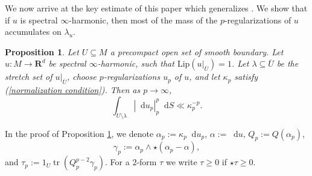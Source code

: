 \documentclass[reqno,11pt]{amsart}
\newcommand{\RR}{\mathbf{R}}
\newcommand*\dif{\mathop{}\!\mathrm{d}}
\DeclareMathOperator{\tr}{tr}
\newcommand{\Lip}{\mathrm{Lip}}
\newtheorem{proposition}[theorem]{Proposition}
\theoremstyle{definition}
\numberwithin{equation}{section}
\begin{document}
We now arrive at the key estimate of this paper which generalizes \cite[Proposition 6.5]{daskalopoulos2022transverse}.
We show that if $u$ is spectral $\infty$-harmonic, then most of the mass of the $p$-regularizations of $u$ accumulates on $\lambda_u$.

\begin{proposition}\label{main estimate}
Let $U \subseteq M$ a precompact open set of smooth boundary.
Let $u: M \to \RR^d$ be spectral $\infty$-harmonic, such that $\Lip(u|_{\overline U}) = 1$.
Let $\lambda \subseteq \overline U$ be the stretch set of $u|_{\overline U}$, choose $p$-regularizations $u_p$ of $u$, and let $\kappa_p$ satisfy (\ref{normalization condition}).
Then as $p \to \infty$,
\begin{equation}\label{decay}
\int_{U \setminus \lambda} |\dif u_p|_{p}^p \dif S \ll \kappa_p^{-p}.
\end{equation}
\end{proposition}

In the proof of Proposition \ref{main estimate}, we denote $\alpha_p := \kappa_p \dif u_p$, $\alpha := \dif u$, $Q_p := Q(\alpha_p)$,
$$\gamma_p := \alpha_p \wedge \star(\alpha_p - \alpha),$$
and $\tau_p := 1_U \tr(Q_p^{p - 2} \gamma_p)$.
For a $2$-form $\tau$ we write $\tau \geq 0$ if $\star \tau \geq 0$.
\end{document}
